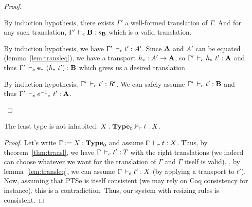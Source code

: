 \documentclass[a4paper,english]{lipics-utf8x}
\begin{document}
\begin{proof}
\begin{caselist}
      \nextcase
      \begin{mathc}
        \ru{\derr \Gamma
          }{\Gamma \derr \mR : \sB}
      \end{mathc}
      By induction hypothesis, there exists $\Gamma'$ a well-formed translation
      of $\Gamma$. And for any such translation, $\Gamma' \,\vdash_e \operatorname{\mathbf{B}} : s_{\operatorname{\mathbf{B}}}$
      which is a valid translation.

      \nextcase
      \begin{mathc}
      \end{mathc}
      By induction hypothesis, we have $\Gamma' \,\vdash_e t' : A'$.
      Since $\operatorname{\mathbf{A}}$ and $A'$ can be equated (lemma~\ref{lem:transleq}),
      we have a transport $h_* : A' \to \operatorname{\mathbf{A}}$, so
      $\Gamma' \,\vdash_e h_*\ t' : \operatorname{\mathbf{A}}$ and thus
      $\Gamma' \,\vdash_e \operatorname{\mathbf{e}}_*\ (h_*\ t') : \operatorname{\mathbf{B}}$ which gives us a desired
      translation.

      \nextcase
      \begin{mathc}
      \end{mathc}
      By induction hypothesis, $\Gamma' \,\vdash_e t' : R'$.
      We can safely assume $\Gamma' \,\vdash_e t' : \operatorname{\mathbf{B}}$ and thus
      $\Gamma' \,\vdash_e {e^{-1}}_*\ t' : \operatorname{\mathbf{A}}$.
    \end{caselist}
  \end{proof}

  \begin{corollary}[Consistency]
    The least type is not inhabited: $X : \operatorname{\mathbf{Type}}_0 \nvdash_r t : X$.
  \end{corollary}

  \begin{proof}
    Let's write $\Gamma := X : \operatorname{\mathbf{Type}}_0$ and assume $\Gamma \,\vdash_r t : X$.
    Thus, by theorem~\ref{thm:transl}, we have $\Gamma \,\vdash_e t' : T$ with
    the right translations (we indeed can choose whatever we want for the
    translation of $\Gamma$ and $\Gamma$ itself is valid).
    \Wlog, by lemma~\ref{lem:transleq}, we can assume
    $\Gamma \,\vdash_e t' : X$ (by applying a transport to $t'$).
    Now, assuming that PTSe is itself consistent (we may rely on Coq consistency
    for instance), this is a contradiction.
    Thus, our system with resizing rules is consistent.
  \end{proof}
\end{document}
